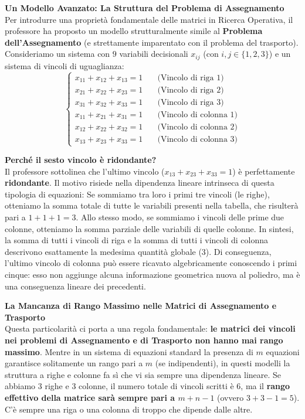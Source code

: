 \documentclass[12pt, a4paper]{article}
\begin{document}
	\vspace{0.6cm}
	\textbf{Un Modello Avanzato: La Struttura del Problema di Assegnamento}\\
	Per introdurre una proprietà fondamentale delle matrici in Ricerca Operativa, il professore ha proposto un modello strutturalmente simile al \textbf{Problema dell'Assegnamento} (e strettamente imparentato con il problema del trasporto). Consideriamo un sistema con $9$ variabili decisionali $x_{ij}$ (con $i, j \in \{1, 2, 3\}$) e un sistema di vincoli di uguaglianza:
	\[
	\begin{cases}
		x_{11} + x_{12} + x_{13} = 1 \quad &\text{(Vincolo di riga 1)} \\
		x_{21} + x_{22} + x_{23} = 1 \quad &\text{(Vincolo di riga 2)} \\
		x_{31} + x_{32} + x_{33} = 1 \quad &\text{(Vincolo di riga 3)} \\
		x_{11} + x_{21} + x_{31} = 1 \quad &\text{(Vincolo di colonna 1)} \\
		x_{12} + x_{22} + x_{32} = 1 \quad &\text{(Vincolo di colonna 2)} \\
		x_{13} + x_{23} + x_{33} = 1 \quad &\text{(Vincolo di colonna 3)}
	\end{cases}
	\]
	
	\vspace{0.3cm}
	\textbf{Perché il sesto vincolo è ridondante?}\\
	Il professore sottolinea che l'ultimo vincolo ($x_{13} + x_{23} + x_{33} = 1$) è perfettamente \textbf{ridondante}. Il motivo risiede nella dipendenza lineare intrinseca di questa tipologia di equazioni:
	Se sommiamo tra loro i primi tre vincoli (le righe), otteniamo la somma totale di tutte le variabili presenti nella tabella, che risulterà pari a $1 + 1 + 1 = 3$.
	Allo stesso modo, se sommiamo i vincoli delle prime due colonne, otteniamo la somma parziale delle variabili di quelle colonne.
	In sintesi, la somma di tutti i vincoli di riga e la somma di tutti i vincoli di colonna descrivono esattamente la medesima quantità globale ($3$). Di conseguenza, l'ultimo vincolo di colonna può essere ricavato algebricamente conoscendo i primi cinque: esso non aggiunge alcuna informazione geometrica nuova al poliedro, ma è una conseguenza lineare dei precedenti.
	
	\vspace{0.3cm}
	\textbf{La Mancanza di Rango Massimo nelle Matrici di Assegnamento e Trasporto}\\
	Questa particolarità ci porta a una regola fondamentale: \textbf{le matrici dei vincoli nei problemi di Assegnamento e di Trasporto non hanno mai rango massimo}.
	Mentre in un sistema di equazioni standard la presenza di $m$ equazioni garantisce solitamente un rango pari a $m$ (se indipendenti), in questi modelli la struttura a righe e colonne fa sì che vi sia sempre una dipendenza lineare.
	Se abbiamo $3$ righe e $3$ colonne, il numero totale di vincoli scritti è $6$, ma il \textbf{rango effettivo della matrice sarà sempre pari a $m + n - 1$} (ovvero $3 + 3 - 1 = 5$). C'è sempre una riga o una colonna di troppo che dipende dalle altre.
	
\end{document}
